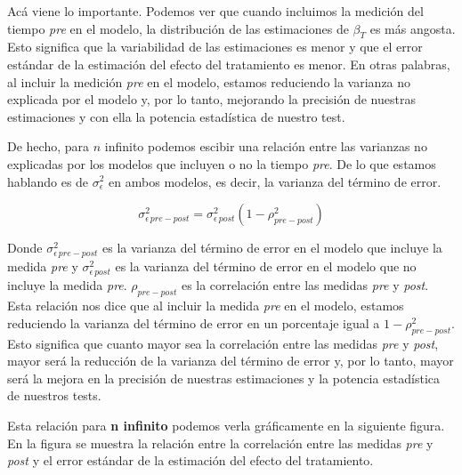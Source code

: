 \documentclass[
  letterpaper,
  DIV=11,
  numbers=noendperiod,
  oneside]{scrreprt}
\begin{document}
Acá viene lo importante. Podemos ver que cuando incluimos la medición
del tiempo \emph{pre} en el modelo, la distribución de las estimaciones
de \(\beta_T\) es más angosta. Esto significa que la variabilidad de las
estimaciones es menor y que el error estándar de la estimación del
efecto del tratamiento es menor. En otras palabras, al incluir la
medición \emph{pre} en el modelo, estamos reduciendo la varianza no
explicada por el modelo y, por lo tanto, mejorando la precisión de
nuestras estimaciones y con ella la potencia estadística de nuestro
test.

De hecho, para \(n\) infinito podemos escibir una relación entre las
varianzas no explicadas por los modelos que incluyen o no la tiempo
\emph{pre}. De lo que estamos hablando es de \(\sigma_\epsilon^2\) en
ambos modelos, es decir, la varianza del término de error.

\[
\sigma^2_{\epsilon \,pre-post} = \sigma^2_{\epsilon \, post} (1 - \rho_{pre-post}^2)
\]

Donde \(\sigma^2_{\epsilon \,pre-post}\) es la varianza del término de
error en el modelo que incluye la medida \emph{pre} y
\(\sigma^2_{\epsilon \, post}\) es la varianza del término de error en
el modelo que no incluye la medida \emph{pre}. \(\rho_{pre-post}\) es la
correlación entre las medidas \emph{pre} y \emph{post}. Esta relación
nos dice que al incluir la medida \emph{pre} en el modelo, estamos
reduciendo la varianza del término de error en un porcentaje igual a
\(1 - \rho_{pre-post}^2\). Esto significa que cuanto mayor sea la
correlación entre las medidas \emph{pre} y \emph{post}, mayor será la
reducción de la varianza del término de error y, por lo tanto, mayor
será la mejora en la precisión de nuestras estimaciones y la potencia
estadística de nuestros tests.

Esta relación para \textbf{n infinito} podemos verla gráficamente en la
siguiente figura. En la figura se muestra la relación entre la
correlación entre las medidas \emph{pre} y \emph{post} y el error
estándar de la estimación del efecto del tratamiento.
\end{document}
